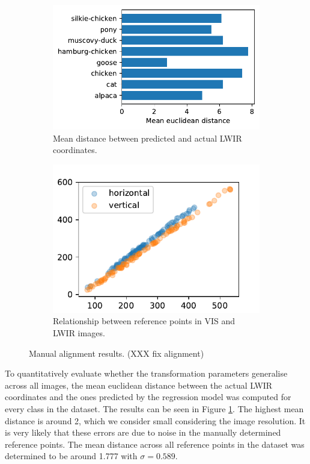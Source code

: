 \documentclass{l4proj}
\begin{document}
\begin{figure}[ht]
  \centering
  \begin{subfigure}[t]{0.45\textwidth}
    \includegraphics[width=\textwidth]{images/registration/error}
    \caption{Mean distance between predicted and actual LWIR coordinates.}
    \label{fig:registration_error}
  \end{subfigure}
  \begin{subfigure}[t]{0.4\textwidth}
    \includegraphics[width=\textwidth]{images/registration/x_y}
    \caption{Relationship between reference points in VIS and LWIR images.}
    \label{fig:registration_relationship}
  \end{subfigure}
  \caption{Manual alignment results. (XXX fix alignment)}
\end{figure}

To quantitatively evaluate whether the transformation parameters generalise across all images, the mean euclidean distance between the actual LWIR coordinates and the ones predicted by the regression model was computed for every class in the dataset. The results can be seen in Figure \ref{fig:registration_error}. The highest mean distance is around 2, which we consider small considering the image resolution. It is very likely that these errors are due to noise in the manually determined reference points. The mean distance across all reference points in the dataset was determined to be around 1.777 with $\sigma = 0.589$.
\end{document}
